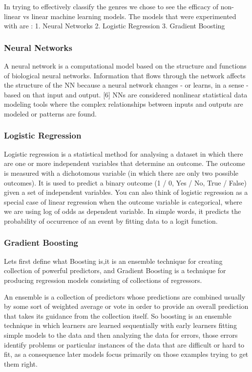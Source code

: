 \documentclass[11pt]{article}
\begin{document}
In trying to effectively classify the genres we chose to see the
efficacy of non-linear vs linear machine learning models. The models
that were experimented with are : 1. Neural Networks 2. Logistic
Regression 3. Gradient Boosting

    \hypertarget{neural-networks}{%
\subsubsection{Neural Networks}\label{neural-networks}}

A neural network is a computational model based on the structure and
functions of biological neural networks. Information that flows through
the network affects the structure of the NN because a neural network
changes - or learns, in a sense - based on that input and output.
{[}6{]} NNs are considered nonlinear statistical data modeling tools
where the complex relationships between inputs and outputs are modeled
or patterns are found.

    \hypertarget{logistic-regression}{%
\subsubsection{Logistic Regression}\label{logistic-regression}}

Logistic regression is a statistical method for analysing a dataset in
which there are one or more independent variables that determine an
outcome. The outcome is measured with a dichotomous variable (in which
there are only two possible outcomes). It is used to predict a binary
outcome (1 / 0, Yes / No, True / False) given a set of independent
variables. You can also think of logistic regression as a special case
of linear regression when the outcome variable is categorical, where we
are using log of odds as dependent variable. In simple words, it
predicts the probability of occurrence of an event by fitting data to a
logit function.

    \hypertarget{gradient-boosting}{%
\subsubsection{Gradient Boosting}\label{gradient-boosting}}

Lets first define what Boosting is,it is an ensemble technique for
creating collection of powerful predictors, and Gradient Boosting is a
technique for producing regression models consisting of collections of
regressors.

An ensemble is a collection of predictors whose predictions are combined
usually by some sort of weighted average or vote in order to provide an
overall prediction that takes its guidance from the collection itself.
So boosting is an ensemble technique in which learners are learned
sequentially with early learners fitting simple models to the data and
then analyzing the data for errors, those errors identify problems or
particular instances of the data that are difficult or hard to fit, as a
consequence later models focus primarily on those examples trying to get
them right.
\end{document}
